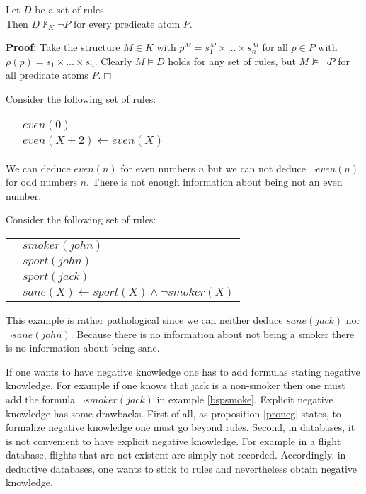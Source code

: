 \begin{Pro} \label{proneg} Let $D$ be a set of rules. \\
Then $D \not\vdash_K \neg P$ for every predicate atom $P$.
\end{Pro}

{\bf Proof:} Take the structure $M\in K$ with $p^M = s_1^M \times \ldots \times s_n^M$ 
for all $p \in P$ with $\rho(p) = s_1 \times \ldots \times s_n$. Clearly $M \models D$ holds
for any set of rules, but $M \not\models \neg P$ for all predicate atoms $P$.\hfill $\Box$

\begin{Bsp} \label{bspeven}
Consider the following set of rules:

\begin{tabular}{ll}
\quad & $even(0)$ \\
\quad & $even(X+2) \leftarrow even(X)$
\end{tabular}

We can deduce $even(n)$ for even numbers $n$ but we can not deduce $\neg even(n)$ for
odd numbers $n$. There is not enough information about being not an even number.
\end{Bsp}

\begin{Bsp} \label{bspsmoke}
Consider the following set of rules:

\begin{tabular}{ll}
\quad & $smoker(john)$ \\
\quad & $sport(john)$ \\
\quad & $sport(jack)$ \\
\quad & $sane(X) \leftarrow sport(X) \wedge \neg smoker(X)$
\end{tabular}

This example is rather pathological since we can neither deduce $sane(jack)$ nor
$\neg sane(john)$. Because there is no information about not being a smoker there is 
no information about being sane.
\end{Bsp}

If one wants to have negative knowledge one has to add formulas stating negative knowledge.
For example if one knows that jack is a non-smoker then one must add the formula $\neg 
smoker(jack)$ in example \ref{bspsmoke}. Explicit negative knowledge has some drawbacks. First of 
all, as proposition \ref{proneg} states, to formalize negative knowledge one must go beyond rules. 
Second, in databases, it is not convenient to have explicit negative knowledge. For example
in a flight database, flights that are not existent are simply not recorded. Accordingly, in 
deductive databases, one wants to stick to rules and nevertheless obtain negative knowledge.

